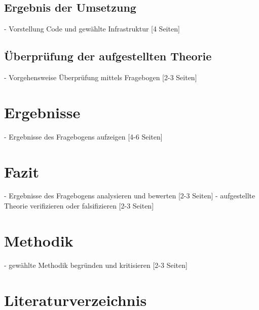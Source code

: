 \documentclass[a4paper]{scrartcl}
\begin{document}
\subsection{Ergebnis der Umsetzung}


    - Vorstellung Code und gewählte Infrastruktur [4 Seiten]

\subsection{Überprüfung der aufgestellten Theorie}
    - Vorgehensweise Überprüfung mittels Fragebogen [2-3 Seiten]

\section{Ergebnisse}
    - Ergebnisse des Fragebogens aufzeigen [4-6 Seiten]

\section{Fazit}
    - Ergebnisse des Fragebogens analysieren und bewerten [2-3 Seiten]
    - aufgestellte Theorie verifizieren oder falsifizieren [2-3 Seiten]

\section{Methodik}
    - gewählte Methodik begründen und kritisieren [2-3 Seiten]


\newpage


\setcounter{page}{6}


\section*{Literaturverzeichnis}

\singlespacing
\end{document}
